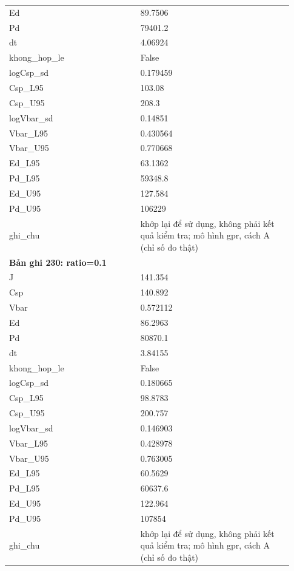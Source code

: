 \begin{longtable}{p{0.43\linewidth}p{0.50\linewidth}}
Ed & 89.7506 \\
Pd & 79401.2 \\
dt & 4.06924 \\
khong\_\allowbreak hop\_\allowbreak le & False \\
logCsp\_\allowbreak sd & 0.179459 \\
Csp\_\allowbreak L95 & 103.08 \\
Csp\_\allowbreak U95 & 208.3 \\
logVbar\_\allowbreak sd & 0.14851 \\
Vbar\_\allowbreak L95 & 0.430564 \\
Vbar\_\allowbreak U95 & 0.770668 \\
Ed\_\allowbreak L95 & 63.1362 \\
Pd\_\allowbreak L95 & 59348.8 \\
Ed\_\allowbreak U95 & 127.584 \\
Pd\_\allowbreak U95 & 106229 \\
ghi\_\allowbreak chu & khớp lại để sử dụng, không phải kết quả kiểm tra; mô hình gpr, cách A (chỉ số đo thật) \\
\midrule
\multicolumn{2}{p{0.95\linewidth}}{\textbf{Bản ghi 230: ratio=0.1}} \\
J & 141.354 \\
Csp & 140.892 \\
Vbar & 0.572112 \\
Ed & 86.2963 \\
Pd & 80870.1 \\
dt & 3.84155 \\
khong\_\allowbreak hop\_\allowbreak le & False \\
logCsp\_\allowbreak sd & 0.180665 \\
Csp\_\allowbreak L95 & 98.8783 \\
Csp\_\allowbreak U95 & 200.757 \\
logVbar\_\allowbreak sd & 0.146903 \\
Vbar\_\allowbreak L95 & 0.428978 \\
Vbar\_\allowbreak U95 & 0.763005 \\
Ed\_\allowbreak L95 & 60.5629 \\
Pd\_\allowbreak L95 & 60637.6 \\
Ed\_\allowbreak U95 & 122.964 \\
Pd\_\allowbreak U95 & 107854 \\
ghi\_\allowbreak chu & khớp lại để sử dụng, không phải kết quả kiểm tra; mô hình gpr, cách A (chỉ số đo thật) \\

\end{longtable}

